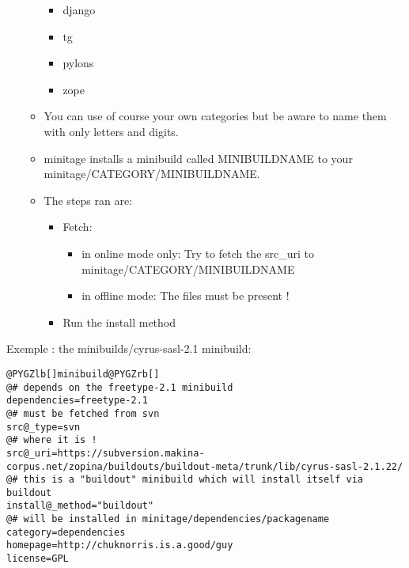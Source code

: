 \documentclass[letterpaper,10pt,english]{sphinxmanual}
\begin{document}
\begin{itemize}
\begin{itemize}
\begin{itemize}
\item {} 
django

\item {} 
tg

\item {} 
pylons

\item {} 
zope

\end{itemize}

\item {} 
You can use of course your own categories but be aware to name them
with only letters and digits.

\item {} 
minitage installs a minibuild called MINIBUILDNAME to your minitage/CATEGORY/MINIBUILDNAME.

\item {} 
The steps ran are:
\begin{itemize}
\item {} 
Fetch:
\begin{itemize}
\item {} 
in online mode only: Try to fetch the src\_uri to minitage/CATEGORY/MINIBUILDNAME

\item {} 
in offline mode: The files must be present !

\end{itemize}

\item {} 
Run the install method

\end{itemize}

\end{itemize}

\end{itemize}

Exemple : the minibuilds/cyrus-sasl-2.1 minibuild:

\begin{Verbatim}[commandchars=@\[\]]
@PYGZlb[]minibuild@PYGZrb[]
@# depends on the freetype-2.1 minibuild
dependencies=freetype-2.1
@# must be fetched from svn
src@_type=svn
@# where it is !
src@_uri=https://subversion.makina-corpus.net/zopina/buildouts/buildout-meta/trunk/lib/cyrus-sasl-2.1.22/
@# this is a "buildout" minibuild which will install itself via buildout
install@_method="buildout"
@# will be installed in minitage/dependencies/packagename
category=dependencies
homepage=http://chuknorris.is.a.good/guy
license=GPL
\end{Verbatim}
\end{document}

